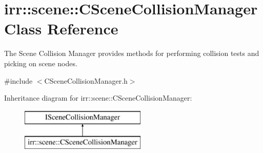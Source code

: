 \hypertarget{classirr_1_1scene_1_1_c_scene_collision_manager}{\section{irr\-:\-:scene\-:\-:C\-Scene\-Collision\-Manager Class Reference}
\label{classirr_1_1scene_1_1_c_scene_collision_manager}
}


The Scene Collision Manager provides methods for performing collision tests and picking on scene nodes.  




{\ttfamily \#include $<$C\-Scene\-Collision\-Manager.\-h$>$}

Inheritance diagram for irr\-:\-:scene\-:\-:C\-Scene\-Collision\-Manager\-:\begin{figure}[H]
\begin{center}
\leavevmode
\includegraphics[height=2.000000cm]{classirr_1_1scene_1_1_c_scene_collision_manager}
\end{center}
\end{figure}
